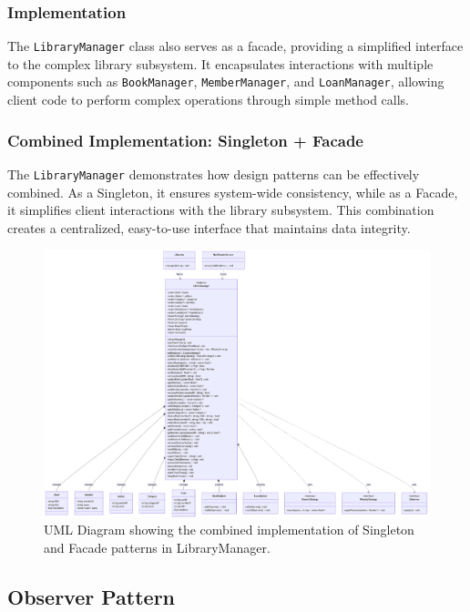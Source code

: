 \subsubsection{Implementation}
The \texttt{LibraryManager} class also serves as a facade, providing a simplified interface to the complex library subsystem. It encapsulates interactions with multiple components such as \texttt{BookManager}, \texttt{MemberManager}, and \texttt{LoanManager}, allowing client code to perform complex operations through simple method calls.

\newpage

\subsubsection{Combined Implementation: Singleton + Facade}
The \texttt{LibraryManager} demonstrates how design patterns can be effectively combined. As a Singleton, it ensures system-wide consistency, while as a Facade, it simplifies client interactions with the library subsystem. This combination creates a centralized, easy-to-use interface that maintains data integrity.

\begin{figure}[H]
    \centering
    \includegraphics[width=\textwidth]{figures/singleton_pattern.png}
    \caption{UML Diagram showing the combined implementation of Singleton and Facade patterns in LibraryManager.}
    \label{fig:singleton_facade_pattern}
\end{figure}

\newpage

\subsection{Observer Pattern}
